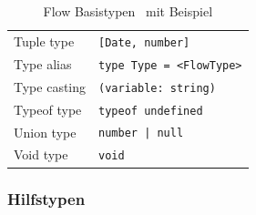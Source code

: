 \begin{table}[tbp]
\begin{tabularx}{\textwidth}{@{}ll@{}}
    Tuple type                 & \texttt{{[}Date, number{]}}              \\
    Type alias                 & \texttt{type Type = <{}FlowType>{}}      \\
    Type casting               & \texttt{(variable: string)}              \\
    Typeof type                & \texttt{typeof undefined}                \\
    Union type                 & \texttt{number | null}                   \\
    Void type                  & \texttt{void}                            \\
    \midrule
  \end{tabularx}
  \caption{Flow Basistypen~\autocite{FLOW_TYPE_ANNOTATIONS} mit Beispiel}
  \label{tab:flow-base-types}
\end{table}

\subsubsection{Hilfstypen}

